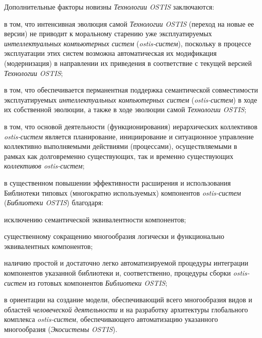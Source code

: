 Дополнительные факторы новизны \textit{Технологии OSTIS} заключаются: 
\begin{textitemize}
	\item в том, что интенсивная эволюция самой \textit{Технологии OSTIS} (переход на новые ее версии) не приводит к моральному старению уже эксплуатируемых \textit{интеллектуальных компьютерных систем} (\textit{ostis-систем}), поскольку в процессе эксплуатации этих систем возможна автоматическая их модификация (модернизация) в направлении их приведения в соответствие с текущей версией \textit{Технологии OSTIS}; 
	\item в том, что обеспечивается перманентная поддержка семантической совместимости эксплуатируемых \textit{интеллектуальных компьютерных систем} (\textit{ostis-систем}) в ходе их собственной эволюции, а также в ходе эволюции самой \textit{Технологии OSTIS}; 
	\item в том, что основой деятельности (функционирования) иерархических коллективов \textit{ostis-систем} является  планирование, инициирование и ситуационное управление коллективно выполняемыми действиями (процессами), осуществляемыми в рамках как долговременно существующих, так и временно существующих \textit{коллективов ostis-систем}; 
	\item в существенном повышении эффективности расширения и использования Библиотеки типовых (многократно используемых) компонентов \textit{ostis-систем} (\textit{Библиотеки OSTIS}) благодаря: 
	\begin{textitemize}
		\item исключению семантической эквивалентности компонентов;
		\item существенному сокращению многообразия логически и функционально эквивалентных компонентов; 
		\item наличию простой и достаточно легко автоматизируемой процедуры интеграции компонентов указанной библиотеки и, соответственно, процедуры сборки \textit{ostis-систем} из готовых компонентов \textit{Библиотеки OSTIS}; 
	\end{textitemize}
	\item  в ориентации на создание  модели, обеспечивающий  всего многообразия видов и областей \textit{человеческой деятельности} и на разработку архитектуры глобального комплекса \textit{ostis-систем}, обеспечивающего автоматизацию указанного многообразия (\textit{Экосистемы OSTIS}).
\end{textitemize}

